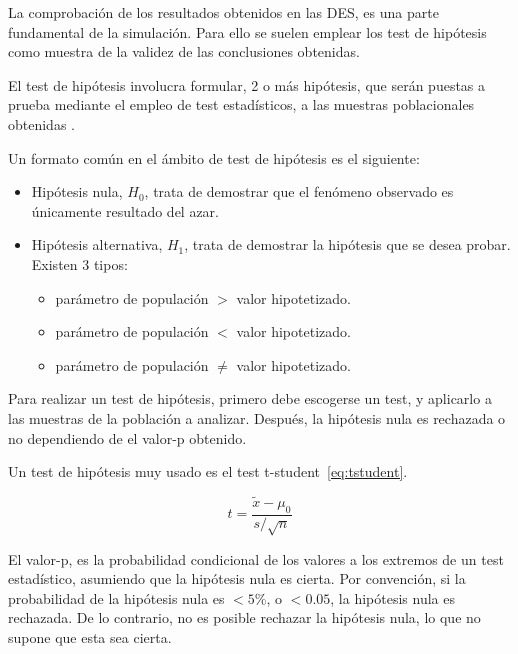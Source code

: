 La comprobación de los resultados obtenidos en las DES,
es una parte fundamental de la simulación.
Para ello se suelen emplear los test de hipótesis como muestra de la validez
de las conclusiones obtenidas.

El test de hipótesis involucra formular,
2 o más hipótesis, que serán puestas a prueba
mediante el empleo de test estadísticos,
a las muestras poblacionales obtenidas \citep{martin2022introduction}.

Un formato común en el ámbito de test de hipótesis es el siguiente:

\begin{itemize}
	\item Hipótesis nula, $H_0$, trata de demostrar que el fenómeno observado es únicamente resultado del azar.
	\item Hipótesis alternativa, $H_1$, trata de demostrar la hipótesis que se desea probar. Existen 3 tipos:
		\begin{itemize}
			\item parámetro de populación $>$ valor hipotetizado.
			\item parámetro de populación $<$ valor hipotetizado.
			\item parámetro de populación $\neq$ valor hipotetizado.
		\end{itemize}
\end{itemize}

Para realizar un test de hipótesis,
primero debe escogerse un test,
y aplicarlo a las muestras de la población a analizar.
Después, la hipótesis nula es rechazada o no dependiendo de el valor-p obtenido.

Un test de hipótesis muy usado es el test t-student~\ref{eq:tstudent}.

\begin{equation}
	t = \frac{\tilde{x} - \mu_0}{s / \sqrt{n}}
	\label{eq:tstudent}
\end{equation}

El valor-p, es la probabilidad condicional de
los valores a los extremos de un test estadístico,
asumiendo que la hipótesis nula es cierta.
Por convención, si la probabilidad de la hipótesis nula es $<5\%$, o $<0.05$,
la hipótesis nula es rechazada.
De lo contrario, no es posible rechazar la hipótesis nula,
lo que no supone que esta sea cierta.
